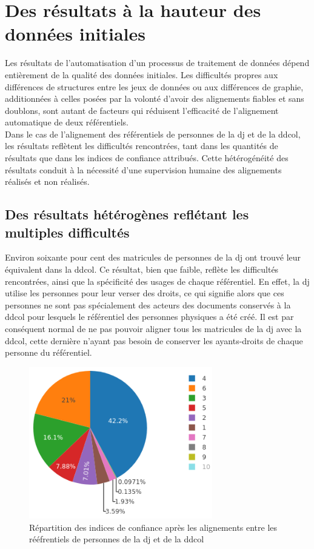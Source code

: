 \section{\label{III-C-3}Des résultats à la hauteur des données initiales}

Les résultats de l'automatisation d'un processus de traitement de données dépend entièrement de la qualité des données initiales. Les difficultés propres aux différences de structures entre les jeux de données ou aux différences de graphie, additionnées à celles posées par la volonté d'avoir des alignements fiables et sans doublons, sont autant de facteurs qui réduisent l'efficacité de l'alignement automatique de deux référentiels.\\

Dans le cas de l'alignement des référentiels de personnes de la \ac{dj} et de la \ac{ddcol}, les résultats reflètent les difficultés rencontrées, tant dans les quantités de résultats que dans les indices de confiance attribués. Cette hétérogénéité des résultats conduit à la nécessité d'une supervision humaine des alignements réalisés et non réalisés.

\subsection{\label{III-C-3-a}Des résultats hétérogènes reflétant les multiples difficultés}

Environ soixante pour cent des matricules de personnes de la \ac{dj} ont trouvé leur équivalent dans la \ac{ddcol}. Ce résultat, bien que faible, reflète les difficultés rencontrées, ainsi que la spécificité des usages de chaque référentiel. En effet, la \ac{dj} utilise les personnes pour leur verser des droits, ce qui signifie alors que ces personnes ne sont pas spécialement des acteurs des documents conservés à la \ac{ddcol} pour lesquels le référentiel des personnes physiques a été créé. Il est par conséquent normal de ne pas pouvoir aligner tous les matricules de la \ac{dj} avec la \ac{ddcol}, cette dernière n'ayant pas besoin de conserver les ayants-droits de chaque personne du référentiel.

\begin{figure}[!h]
	\centering
	\includegraphics[width=8cm]{images/indices.png}
	\caption{Répartition des indices de confiance après les alignements entre les rééfrentiels de personnes de la \ac{dj} et de la \ac{ddcol}}
	\label{indices}
\end{figure}

